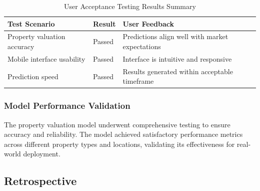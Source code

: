 \begin{table}[htbp]
    \centering
    \begin{tabular}{|p{4cm}|p{3cm}|p{6cm}|}
        \hline
        \textbf{Test Scenario} & \textbf{Result} & \textbf{User Feedback} \\
        \hline
        Property valuation accuracy & Passed & Predictions align well with market expectations \\
        \hline
        Mobile interface usability & Passed & Interface is intuitive and responsive \\
        \hline
        Prediction speed & Passed & Results generated within acceptable timeframe \\
        \hline
    \end{tabular}
    \caption{User Acceptance Testing Results Summary}
    \label{tab:uat-results}
\end{table}

\subsubsection{Model Performance Validation}
The property valuation model underwent comprehensive testing to ensure accuracy and reliability. The model achieved satisfactory performance metrics across different property types and locations, validating its effectiveness for real-world deployment.

\subsection{Retrospective}

